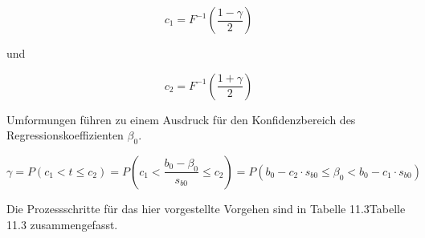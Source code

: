 \begin{equation}\label{eq:twelvesixtysix}
c_{1} =F^{-1} \left(\dfrac{1-\gamma }{2} \right)
\end{equation}

\noindent und

\begin{equation}\label{eq:twelvesixtyseven}
c_{2} =F^{-1} \left(\dfrac{1+\gamma }{2} \right)
\end{equation}

\noindent Umformungen f\"{u}hren zu einem Ausdruck f\"{u}r den Konfidenzbereich des Regressionskoeffizienten $\beta_{0}$.

\begin{equation}\label{eq:twelvesixtyeight}
\gamma =P\left(c_{1} <t\le c_{2} \right)=P\left(c_{1} <\dfrac{b_{0} -\beta _{0} }{s_{b0} } \le c_{2} \right)=P\left(b_{0} -c_{2} \cdot s_{b0} \le \beta _{0} <b_{0} -c_{1} \cdot s_{b0} \right)
\end{equation}

\noindent Die Prozessschritte f\"{u}r das hier vorgestellte Vorgehen sind in Tabelle 11.3Tabelle 11.3 zusammengefasst.

\clearpage

